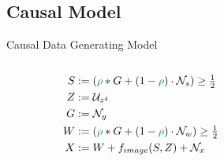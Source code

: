 \documentclass[German, aspectratio=169]{beamer}
\begin{document}
\subsection{Causal Model}
\begin{frame}[t]{Causal Data Generating Model}
    \begin{columns}[t]
        \begin{column}{.4\textwidth}
            \vspace{-0.5cm}
            \begin{align*}
                S & :=(\textcolor{teal}{\rho} * G + (1-\textcolor{teal}{\rho})\cdot \mathcal{N}_s) \geq \tfrac{1}{2} \\
                Z & := \mathcal{U}_{z^4}                                                                             \\
                G & :=\mathcal{N}_g                                                                                  \\
                W & :=(\textcolor{teal}{\rho} * G + (1-\textcolor{teal}{\rho})\cdot \mathcal{N}_w) \geq \tfrac{1}{2} \\
                X & := W + f_{image}(S, Z) + \mathcal{N}_{x}                                                         \\
            \end{align*}
            \vspace{-1.7cm}
            \begin{overlayarea}{\textwidth}{0.34\textheight}
                \begin{figure}
                    \label{fig:distribution}
                \end{figure}
            \end{overlayarea}
        \end{column}
        \begin{column}{.6\textwidth}

\end{column}
\end{columns}
\end{frame}
\end{document}
